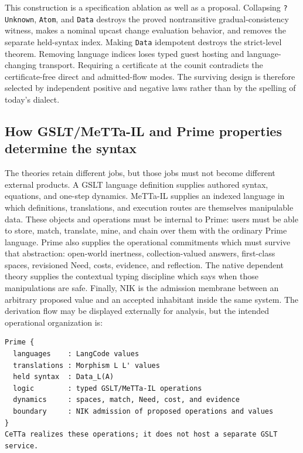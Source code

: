 \documentclass[11pt]{article}
\newcommand{\code}[1]{\texttt{#1}}
\begin{document}
This construction is a specification ablation as well as a proposal.  Collapsing
\code{?Unknown}, \code{Atom}, and \code{Data} destroys the proved nontransitive
gradual-consistency witness, makes a nominal upcast change evaluation behavior,
and removes the separate held-syntax index.  Making \code{Data} idempotent destroys
the strict-level theorem.  Removing language indices loses typed guest hosting and
language-changing transport.  Requiring a certificate at the counit contradicts
the certificate-free direct and admitted-flow modes.  The surviving design is
therefore selected by independent positive and negative laws rather than by the
spelling of today's dialect.

\subsection{How GSLT/MeTTa-IL and Prime properties determine the syntax}

The theories retain different jobs, but those jobs must not become different
external products.  A GSLT language definition supplies authored syntax,
equations, and one-step dynamics.  MeTTa-IL supplies an indexed language in which
definitions, translations, and execution routes are themselves manipulable data.
These objects and operations must be internal to Prime: users must be able to
store, match, translate, mine, and chain over them with the ordinary Prime
language.  Prime also supplies the operational commitments which must survive
that abstraction:
open-world inertness, collection-valued answers, first-class spaces, revisioned
Need, costs, evidence, and reflection.  The native dependent theory supplies
the contextual typing discipline which says when those manipulations are safe.
Finally, NIK is the admission membrane between an arbitrary proposed value and an
accepted inhabitant inside the same system.  The derivation flow may be displayed
externally for analysis, but the intended operational organization is:

\begin{lstlisting}
Prime {
  languages    : LangCode values
  translations : Morphism L L' values
  held syntax  : Data_L(A)
  logic        : typed GSLT/MeTTa-IL operations
  dynamics     : spaces, match, Need, cost, and evidence
  boundary     : NIK admission of proposed operations and values
}
CeTTa realizes these operations; it does not host a separate GSLT service.
\end{lstlisting}
\end{document}
